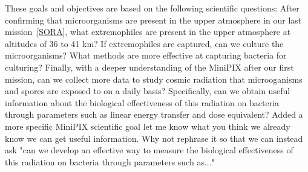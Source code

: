 These goals and objectives are based on the following scientific questions: After confirming that microorganisms are present in the upper atmosphere in our last mission~\ref{SORA}, what extremophiles are present in the upper atmosphere at altitudes of 36 to 41 km?  If extremophiles are captured, can we culture the microorganisms?  What methods are more effective at capturing bacteria for culturing? Finally, with a deeper understanding of the MiniPIX after our first mission, can we collect more data to study cosmic radiation that microoganisms and spores are exposed to on a daily basis? Specifically, can we obtain useful information about the biological effectiveness of this radiation on bacteria through parameters such as linear energy transfer and dose equivalent? 
 {Added a more specific MiniPIX scientific goal let me know what you think}   {we already know we can get useful information.  Why not rephrase it so that we can instead ask "can we develop an effective way to measure the biological effectiveness of this radiation on bacteria through parameters such as..."}



